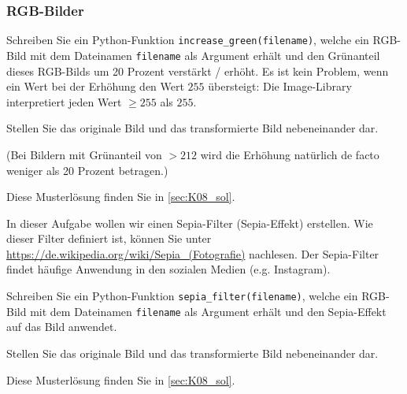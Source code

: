 \subsubsection{RGB-Bilder}
\begin{myexercise}
	Schreiben Sie ein Python-Funktion \lstinline|increase_green(filename)|, welche ein RGB-Bild mit dem Dateinamen \lstinline|filename| als Argument erhält und den Grünanteil dieses RGB-Bilds um 20 Prozent verstärkt / erhöht. Es ist kein Problem, wenn ein Wert bei der Erhöhung den Wert $255$ übersteigt: Die Image-Library interpretiert jeden Wert $\geq 255$ als $255$.

	Stellen Sie das originale Bild und das transformierte Bild nebeneinander dar.

	(Bei Bildern mit Grünanteil von $> 212$ wird die Erhöhung natürlich de facto weniger als 20 Prozent betragen.)
	\begin{myanswer}
		Diese Musterlösung finden Sie in \cref{sec:K08_sol}.
	\end{myanswer}
\end{myexercise}

\begin{myexercise}
	In dieser Aufgabe wollen wir einen Sepia-Filter (Sepia-Effekt) erstellen. Wie dieser Filter definiert ist, können Sie unter \url{https://de.wikipedia.org/wiki/Sepia_(Fotografie)} nachlesen. Der Sepia-Filter findet häufige Anwendung in den sozialen Medien (e.g. Instagram).

	Schreiben Sie ein Python-Funktion \lstinline|sepia_filter(filename)|, welche ein RGB-Bild mit dem Dateinamen \lstinline|filename| als Argument erhält und den Sepia-Effekt auf das Bild anwendet.

	Stellen Sie das originale Bild und das transformierte Bild nebeneinander dar.
	\begin{myanswer}
		Diese Musterlösung finden Sie in \cref{sec:K08_sol}.
	\end{myanswer}
\end{myexercise}

